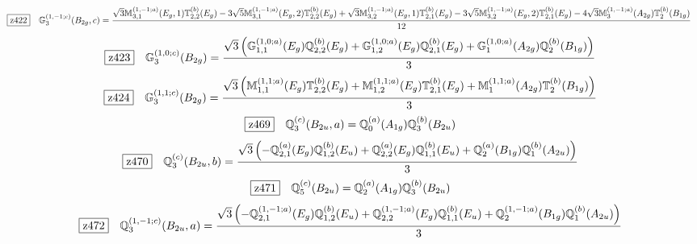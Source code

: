 \documentclass[fleqn,10pt,landscape]{jsarticle}
\begin{document}
\begin{dmath*}
\hspace*{3mm}\fbox{z422}\quad \mathbb{G}_{3}^{(1,-1;c)}(B_{2g},c)=\frac{\sqrt{3} \mathbb{M}_{3,1}^{(1,-1;a)}(E_{g},1) \mathbb{T}_{2,2}^{(b)}(E_{g}) - 3 \sqrt{5} \mathbb{M}_{3,1}^{(1,-1;a)}(E_{g},2) \mathbb{T}_{2,2}^{(b)}(E_{g}) + \sqrt{3} \mathbb{M}_{3,2}^{(1,-1;a)}(E_{g},1) \mathbb{T}_{2,1}^{(b)}(E_{g}) - 3 \sqrt{5} \mathbb{M}_{3,2}^{(1,-1;a)}(E_{g},2) \mathbb{T}_{2,1}^{(b)}(E_{g}) - 4 \sqrt{3} \mathbb{M}_{3}^{(1,-1;a)}(A_{2g}) \mathbb{T}_{2}^{(b)}(B_{1g})}{12}
\end{dmath*}
\begin{dmath*}
\hspace*{3mm}\fbox{z423}\quad \mathbb{G}_{3}^{(1,0;c)}(B_{2g})=\frac{\sqrt{3} \left(\mathbb{G}_{1,1}^{(1,0;a)}(E_{g}) \mathbb{Q}_{2,2}^{(b)}(E_{g}) + \mathbb{G}_{1,2}^{(1,0;a)}(E_{g}) \mathbb{Q}_{2,1}^{(b)}(E_{g}) + \mathbb{G}_{1}^{(1,0;a)}(A_{2g}) \mathbb{Q}_{2}^{(b)}(B_{1g})\right)}{3}
\end{dmath*}
\begin{dmath*}
\hspace*{3mm}\fbox{z424}\quad \mathbb{G}_{3}^{(1,1;c)}(B_{2g})=\frac{\sqrt{3} \left(\mathbb{M}_{1,1}^{(1,1;a)}(E_{g}) \mathbb{T}_{2,2}^{(b)}(E_{g}) + \mathbb{M}_{1,2}^{(1,1;a)}(E_{g}) \mathbb{T}_{2,1}^{(b)}(E_{g}) + \mathbb{M}_{1}^{(1,1;a)}(A_{2g}) \mathbb{T}_{2}^{(b)}(B_{1g})\right)}{3}
\end{dmath*}
\begin{dmath*}
\hspace*{3mm}\fbox{z469}\quad \mathbb{Q}_{3}^{(c)}(B_{2u},a)=\mathbb{Q}_{0}^{(a)}(A_{1g}) \mathbb{Q}_{3}^{(b)}(B_{2u})
\end{dmath*}
\begin{dmath*}
\hspace*{3mm}\fbox{z470}\quad \mathbb{Q}_{3}^{(c)}(B_{2u},b)=\frac{\sqrt{3} \left(- \mathbb{Q}_{2,1}^{(a)}(E_{g}) \mathbb{Q}_{1,2}^{(b)}(E_{u}) + \mathbb{Q}_{2,2}^{(a)}(E_{g}) \mathbb{Q}_{1,1}^{(b)}(E_{u}) + \mathbb{Q}_{2}^{(a)}(B_{1g}) \mathbb{Q}_{1}^{(b)}(A_{2u})\right)}{3}
\end{dmath*}
\begin{dmath*}
\hspace*{3mm}\fbox{z471}\quad \mathbb{Q}_{5}^{(c)}(B_{2u})=\mathbb{Q}_{2}^{(a)}(A_{1g}) \mathbb{Q}_{3}^{(b)}(B_{2u})
\end{dmath*}
\begin{dmath*}
\hspace*{3mm}\fbox{z472}\quad \mathbb{Q}_{3}^{(1,-1;c)}(B_{2u},a)=\frac{\sqrt{3} \left(- \mathbb{Q}_{2,1}^{(1,-1;a)}(E_{g}) \mathbb{Q}_{1,2}^{(b)}(E_{u}) + \mathbb{Q}_{2,2}^{(1,-1;a)}(E_{g}) \mathbb{Q}_{1,1}^{(b)}(E_{u}) + \mathbb{Q}_{2}^{(1,-1;a)}(B_{1g}) \mathbb{Q}_{1}^{(b)}(A_{2u})\right)}{3}
\end{dmath*}
\end{document}
